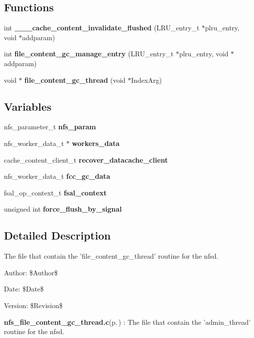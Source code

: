 \subsection*{Functions}
\begin{CompactItemize}
\item 
int {\bf \_\-\_\-\_\-cache\_\-content\_\-invalidate\_\-flushed} (LRU\_\-entry\_\-t $\ast$plru\_\-entry, void $\ast$addparam)
\item 
int {\bf file\_\-content\_\-gc\_\-manage\_\-entry} (LRU\_\-entry\_\-t $\ast$plru\_\-entry, void $\ast$addparam)
\item 
void $\ast$ {\bf file\_\-content\_\-gc\_\-thread} (void $\ast$Index\-Arg)
\end{CompactItemize}
\subsection*{Variables}
\begin{CompactItemize}
\item 
nfs\_\-parameter\_\-t {\bf nfs\_\-param}
\item 
nfs\_\-worker\_\-data\_\-t $\ast$ {\bf workers\_\-data}
\item 
cache\_\-content\_\-client\_\-t {\bf recover\_\-datacache\_\-client}
\item 
nfs\_\-worker\_\-data\_\-t {\bf fcc\_\-gc\_\-data}
\item 
fsal\_\-op\_\-context\_\-t {\bf fsal\_\-context}
\item 
unsigned int {\bf force\_\-flush\_\-by\_\-signal}
\end{CompactItemize}


\subsection{Detailed Description}
The file that contain the 'file\_\-content\_\-gc\_\-thread' routine for the nfsd. 

\begin{Desc}
\item[Author:]\$Author\$ \end{Desc}
\begin{Desc}
\item[Date:]\$Date\$ \end{Desc}
\begin{Desc}
\item[Version:]\$Revision\$ \end{Desc}
{\bf nfs\_\-file\_\-content\_\-gc\_\-thread.c}{\rm (p.\,\pageref{nfs__file__content__gc__thread_8c})} : The file that contain the 'admin\_\-thread' routine for the nfsd.

